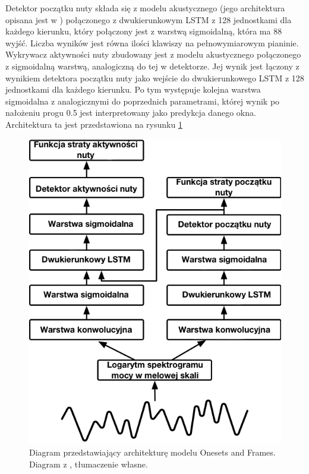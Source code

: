\documentclass[12pt,a4paper,twoside]{mwart}
\begin{document}
Detektor początku nuty składa się z modelu akustycznego (jego architektura opisana jest w 
\cite[1-3]{Transcription:Kelz:AcousticModel}
) połączonego z dwukierunkowym LSTM z 128 jednostkami dla każdego kierunku, który połączony jest z warstwą sigmoidalną, która ma 88 wyjść. Liczba wyników jest równa ilości klawiszy na pełnowymiarowym pianinie. Wykrywacz aktywności nuty zbudowany jest z modelu akustycznego połączonego z sigmoidalną warstwą, analogiczną do tej w detektorze. Jej wynik jest łączony z wynikiem detektora początku nuty jako wejście do dwukierunkowego LSTM z 128 jednostkami dla każdego kierunku. Po tym występuje kolejna warstwa sigmoidalna z analogicznymi do poprzednich parametrami, której wynik po nałożeniu progu 0.5 jest interpretowany jako predykcja danego okna. Architektura ta jest przedstawiona na rysunku \ref{fig:onsetsAndFramesArch}
\begin{figure}[h]
  \begin{center}
    \includegraphics[scale=0.8]{images/architekturaSieciOnesetsFrames.png}
    \caption{Diagram przedstawiający architekturę modelu Onesets and Frames. Diagram z \cite{Transcription:OnsetsAndFrames:Blog}, tłumaczenie własne.}
    \label{fig:onsetsAndFramesArch}
  \end{center}
\end{figure}
\end{document}
